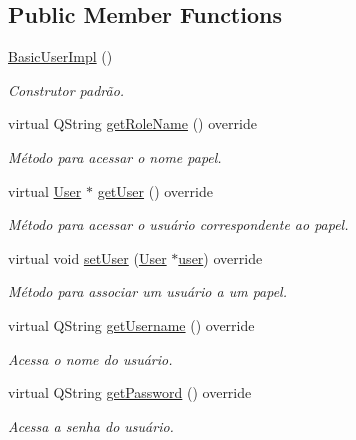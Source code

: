 \subsection*{Public Member Functions}
\begin{DoxyCompactItemize}
\item 
\hyperlink{classBasicUserImpl_a833561b430281e72ab7ba48ab3d7b749}{Basic\+User\+Impl} ()\hypertarget{classBasicUserImpl_a833561b430281e72ab7ba48ab3d7b749}{}\label{classBasicUserImpl_a833561b430281e72ab7ba48ab3d7b749}

\begin{DoxyCompactList}\small\item\em Construtor padrão. \end{DoxyCompactList}\item 
virtual Q\+String \hyperlink{classBasicUserImpl_aaf68b785533f15a61fa30cdef3c82145}{get\+Role\+Name} () override
\begin{DoxyCompactList}\small\item\em Método para acessar o nome papel. \end{DoxyCompactList}\item 
virtual \hyperlink{classUser}{User} $\ast$ \hyperlink{classBasicUserImpl_ace1ba87379b0b3817a089d6933dc0dd7}{get\+User} () override
\begin{DoxyCompactList}\small\item\em Método para acessar o usuário correspondente ao papel. \end{DoxyCompactList}\item 
virtual void \hyperlink{classBasicUserImpl_af94875b3b06f1f1effc3a58fce087e5d}{set\+User} (\hyperlink{classUser}{User} $\ast$\hyperlink{classBasicUserImpl_a1c6cfd2fe227c0eae9bdded2afecf1ec}{user}) override
\begin{DoxyCompactList}\small\item\em Método para associar um usuário a um papel. \end{DoxyCompactList}\item 
virtual Q\+String \hyperlink{classBasicUserImpl_ad5c2ba5c4d7b179e12f25ad843544de0}{get\+Username} () override
\begin{DoxyCompactList}\small\item\em Acessa o nome do usuário. \end{DoxyCompactList}\item 
virtual Q\+String \hyperlink{classBasicUserImpl_a94c89958edd477672063ba246ef77f8a}{get\+Password} () override
\begin{DoxyCompactList}\small\item\em Acessa a senha do usuário. \end{DoxyCompactList}\end{DoxyCompactItemize}
